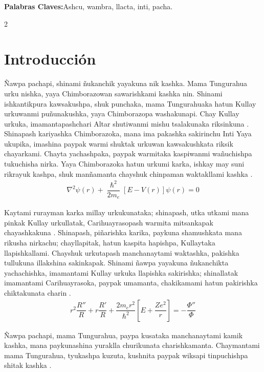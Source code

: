\documentclass[11pt,a4paper]{article}
\begin{document}
\textbf{Palabras Claves:}Ashcu, wambra, llacta, inti, pacha. 
\begin{multicols}{2}

\section*{Introducción}
Ñawpa pachapi, shinami ñukanchik yayakuna nik kashka. Mama Tungurahua urku nishka, yaya Chimborazowan sawarishkami kashka nin. Shinami ishkantikpura kawsakushpa, shuk punchaka, mama Tungurahuaka hatun Kullay urkuwanmi puñunakushka, yaya Chimborazopa washakunapi. Chay Kullay urkuka, imamantapashchari Altar shutiwanmi mishu tsalakunaka riksinkuna \cite{Taruka,Breaking}.\\

Shinapash kariyashka Chimborazoka, mana ima pakashka sakirinchu Inti Yaya ukupika, imashina paypak warmi shuktak urkuwan kawsakushkata riksik chayarkami. Chayta yachashpaka, paypak warmitaka kaspiwanmi wañuchishpa tukuchisha nirka. Yaya Chimborazoka hatun urkumi karka, ishkay may suni rikrayuk kashpa, shuk manñamanta chayshuk chinpaman waktakllami kashka \cite{Universalq}. \\

\begin{eqnarray}
\nabla^{2}\psi(r)+\dfrac{\hslash^{2}}{2m_{e}}\left[E-V(r)\right]\psi(r)=0
\label{schr1}
\end{eqnarray}

Kaytami rurayman karka millay urkukunataka; shinapash, utka utkami mana pinkak Kullay urkullatak, Carihuayrasopash warmita mitsankapak chayashkakuna \cite{Universalq}. Shinapash, piñarishka karika, paykuna shamushkata mana rikusha nirkachu; chayllapitak, hatun kaspita hapishpa, Kullaytaka llapishkallami. Chayshuk urkutapash manchanaytami waktashka, pakishka tullukuna illakshina sakinkapak. Shinami ñawpa yayakuna ñukanchikta yachachishka, imamantami Kullay urkuka llapishka sakirishka; shinallatak imamantami Carihuayrasoka, paypak umamanta, chakikamami hatun pakirishka chiktakunata charin \cite{divide, Sourial, Wei, Meye}.
\begin{eqnarray}
r^{2}\dfrac{R''}{R}+r\dfrac{R'}{R}+\dfrac{2m_{e}r^{2}}{\hslash^{2}}\left[E+\dfrac{Ze^{2}}{r}\right]=-\dfrac{\Phi''}{\Phi}
\label{ec_2}
\end{eqnarray}

Ñawpa pachapi, mama Tungurahua, paypa kusataka manchanaytami kamik kashka, mana paykunashina yuraklla churikunata charishkamanta. Chaymantami mama Tungurahua, tyukashpa kuzuta, kushnita paypak wiksapi tinpuchishpa shitak kashka \cite{divide}. 


\end{multicols}
\end{document}
